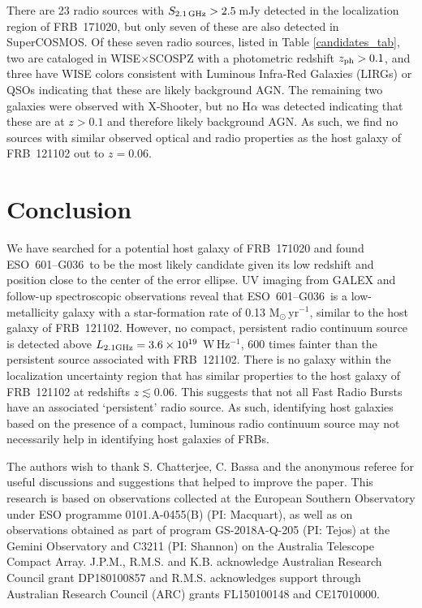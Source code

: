 \documentclass[twocolumn]{aastex63}
\newcommand{\galname}{ESO~601--G036}
\begin{document}
There are 23 radio sources with $S_{\rm 2.1\,GHz}>2.5$\,mJy detected in the localization region of FRB~171020, but only seven of these are also detected in SuperCOSMOS. 
Of these seven radio sources, listed in Table \ref{candidates_tab}, two are cataloged in WISE$\times$SCOSPZ with a photometric redshift $z_{\rm ph}>0.1$, and three have WISE colors consistent with Luminous Infra-Red Galaxies (LIRGs) or QSOs indicating that these are likely background AGN.
The remaining two galaxies 
were observed with X-Shooter, but no H$\alpha$ was detected indicating that these are at $z>0.1$ and therefore likely background AGN. As such, we find no sources with similar observed optical and radio properties as the host galaxy of FRB~121102 out to $z=0.06$. 

\section{Conclusion}

We have searched for a potential host galaxy of FRB~171020 and found \galname\ to be the most likely candidate given its low redshift and position close to the center of the error ellipse. 
UV imaging from GALEX and follow-up spectroscopic observations reveal that \galname\ is a low-metallicity galaxy with a star-formation rate of 0.13 M$_\odot$\,yr$^{-1}$, similar to the host galaxy of FRB~121102. However, no compact, persistent radio continuum source is detected above $L_{\rm 2.1 GHz}=3.6\times 10^{19}$ W\,Hz$^{-1}$, $600$ times fainter than the persistent source associated with FRB~121102.
There is no galaxy within the localization uncertainty region that has similar properties to the host galaxy of FRB~121102 at redshifts $z\lesssim0.06$. This suggests that not all Fast Radio Bursts have an associated `persistent' radio source. As such, identifying host galaxies based on the presence of a compact, luminous radio continuum source may not necessarily help in identifying host galaxies of FRBs.\\



\acknowledgments

The authors wish to thank S. Chatterjee, C. Bassa and the anonymous referee for useful discussions and suggestions that helped to improve the paper. This research is based on observations collected at the European Southern Observatory under ESO programme 0101.A-0455(B) (PI: Macquart), as well as on observations obtained as part of program GS-2018A-Q-205 (PI: Tejos) at the Gemini Observatory and C3211 (PI: Shannon) on the Australia Telescope Compact Array. J.P.M., R.M.S. and K.B. acknowledge Australian Research Council grant DP180100857 and R.M.S. acknowledges support through Australian Research Council (ARC) grants FL150100148 and CE17010000.
\end{document}
